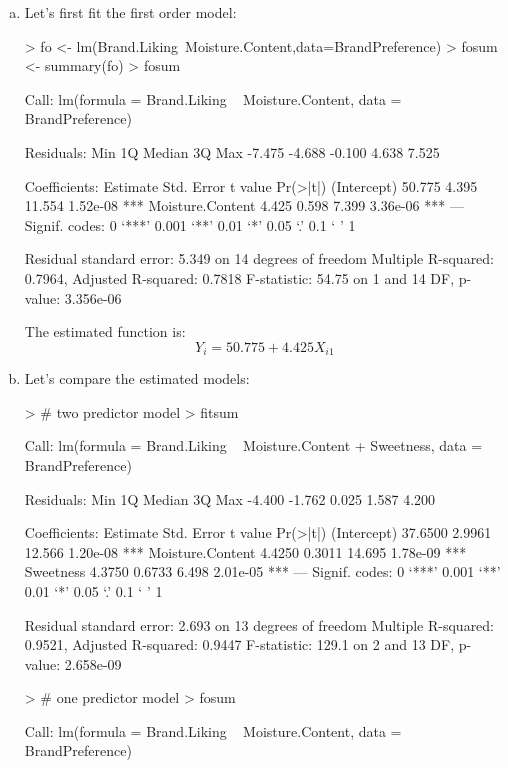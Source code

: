 \documentclass{article}
\begin{document}
\begin{enumerate}[a)]
\item{} Let's first fit the first order model:

\begin{Schunk}
\begin{Sinput}
> fo <- lm(Brand.Liking~Moisture.Content,data=BrandPreference)
> fosum <- summary(fo)
> fosum
\end{Sinput}
\begin{Soutput}
Call:
lm(formula = Brand.Liking ~ Moisture.Content, data = BrandPreference)

Residuals:
   Min     1Q Median     3Q    Max 
-7.475 -4.688 -0.100  4.638  7.525 

Coefficients:
                 Estimate Std. Error t value Pr(>|t|)    
(Intercept)        50.775      4.395  11.554 1.52e-08 ***
Moisture.Content    4.425      0.598   7.399 3.36e-06 ***
---
Signif. codes:  0 ‘***’ 0.001 ‘**’ 0.01 ‘*’ 0.05 ‘.’ 0.1 ‘ ’ 1

Residual standard error: 5.349 on 14 degrees of freedom
Multiple R-squared:  0.7964,	Adjusted R-squared:  0.7818 
F-statistic: 54.75 on 1 and 14 DF,  p-value: 3.356e-06
\end{Soutput}
\end{Schunk}

The estimated function is:
$$ Y_i = 50.775 + 4.425X_{i1} $$

\item{} Let's compare the estimated models:

\begin{Schunk}
\begin{Sinput}
> # two predictor model
> fitsum
\end{Sinput}
\begin{Soutput}
Call:
lm(formula = Brand.Liking ~ Moisture.Content + Sweetness, data = BrandPreference)

Residuals:
   Min     1Q Median     3Q    Max 
-4.400 -1.762  0.025  1.587  4.200 

Coefficients:
                 Estimate Std. Error t value Pr(>|t|)    
(Intercept)       37.6500     2.9961  12.566 1.20e-08 ***
Moisture.Content   4.4250     0.3011  14.695 1.78e-09 ***
Sweetness          4.3750     0.6733   6.498 2.01e-05 ***
---
Signif. codes:  0 ‘***’ 0.001 ‘**’ 0.01 ‘*’ 0.05 ‘.’ 0.1 ‘ ’ 1

Residual standard error: 2.693 on 13 degrees of freedom
Multiple R-squared:  0.9521,	Adjusted R-squared:  0.9447 
F-statistic: 129.1 on 2 and 13 DF,  p-value: 2.658e-09
\end{Soutput}
\begin{Sinput}
> # one predictor model
> fosum
\end{Sinput}
\begin{Soutput}
Call:
lm(formula = Brand.Liking ~ Moisture.Content, data = BrandPreference)


\end{Soutput}
\end{Schunk}
\end{enumerate}
\end{document}
